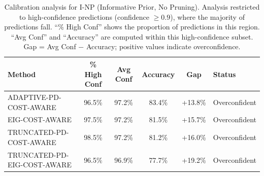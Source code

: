 \begin{table}[htbp]
\centering
\small
\caption{Calibration analysis for I-NP (Informative Prior, No Pruning). Analysis restricted to high-confidence predictions (confidence $\geq 0.9$), where the majority of predictions fall. ``\% High Conf'' shows the proportion of predictions in this region. ``Avg Conf'' and ``Accuracy'' are computed within this high-confidence subset. Gap = Avg Conf $-$ Accuracy; positive values indicate overconfidence.}
\label{tab:calibration-notprune_notuniform}
\begin{tabular}{@{}lccccl@{}}
\toprule
Method & \% High Conf & Avg Conf & Accuracy & Gap & Status \\
\midrule
ADAPTIVE-PD-COST-AWARE & 96.5\% & 97.2\% & 83.4\% & +13.8\% & Overconfident \\
EIG-COST-AWARE & 97.5\% & 97.2\% & 81.5\% & +15.7\% & Overconfident \\
TRUNCATED-PD-COST-AWARE & 98.5\% & 97.2\% & 81.2\% & +16.0\% & Overconfident \\
TRUNCATED-PD-EIG-COST-AWARE & 96.5\% & 96.9\% & 77.7\% & +19.2\% & Overconfident \\
\bottomrule
\end{tabular}
\end{table}